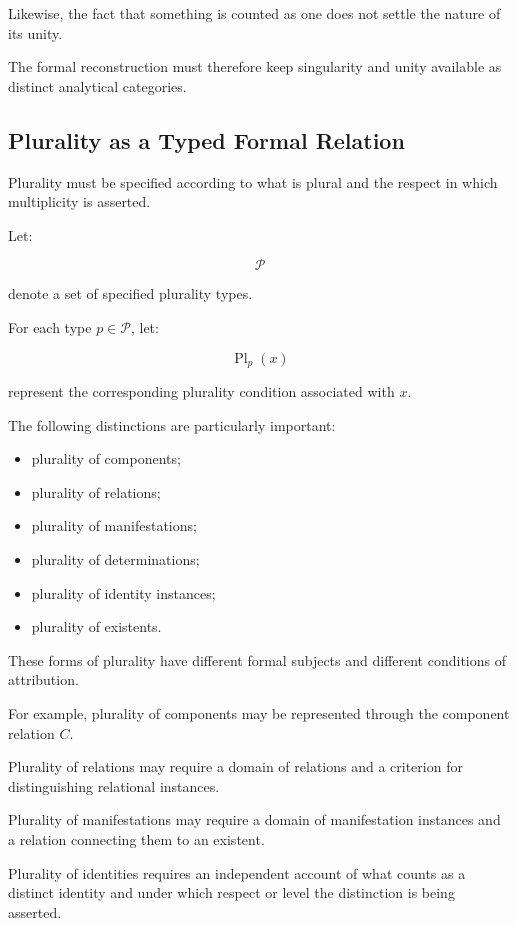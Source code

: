 Likewise, the fact that something is
counted as one does not settle the
nature of its unity.

The formal reconstruction must therefore
keep singularity and unity available
as distinct analytical categories.

\subsection{Plurality as a Typed Formal Relation}

Plurality must be specified according
to what is plural and the respect in
which multiplicity is asserted.

Let:

\[
    \mathcal{P}
\]

denote a set of specified plurality
types.

For each type \(p \in \mathcal{P}\),
let:

\[
    \operatorname{Pl}_p(x)
\]

represent the corresponding plurality
condition associated with \(x\).

The following distinctions are
particularly important:

\begin{itemize}
    \item plurality of components;
    \item plurality of relations;
    \item plurality of manifestations;
    \item plurality of determinations;
    \item plurality of identity instances;
    \item plurality of existents.
\end{itemize}

These forms of plurality have different
formal subjects and different conditions
of attribution.

For example, plurality of components
may be represented through the component
relation \(C\).

Plurality of relations may require a
domain of relations and a criterion
for distinguishing relational instances.

Plurality of manifestations may require
a domain of manifestation instances
and a relation connecting them to an
existent.

Plurality of identities requires an
independent account of what counts as
a distinct identity and under which
respect or level the distinction is
being asserted.

